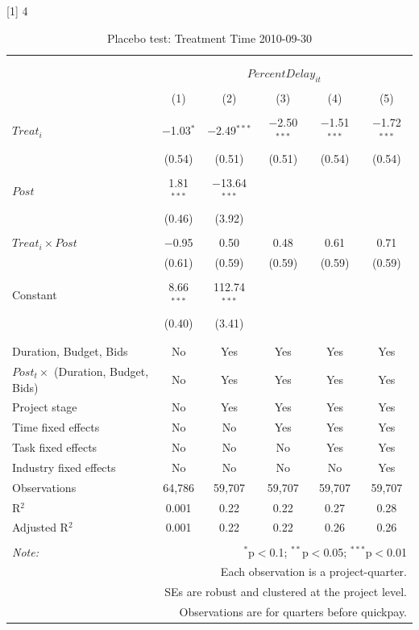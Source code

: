 \documentclass[
]{article}
\begin{document}
{[}1{]} 4

\begin{table}[H] \centering 
  \caption{Placebo test: Treatment Time 2010-09-30} 
  \label{} 
\small 
\begin{tabular}{@{\extracolsep{-2pt}}lccccc} 
\\[-1.8ex]\hline 
\hline \\[-1.8ex] 
\\[-1.8ex] & \multicolumn{5}{c}{$PercentDelay_{it}$} \\ 
\\[-1.8ex] & (1) & (2) & (3) & (4) & (5)\\ 
\hline \\[-1.8ex] 
 $Treat_i$ & $-$1.03$^{*}$ & $-$2.49$^{***}$ & $-$2.50$^{***}$ & $-$1.51$^{***}$ & $-$1.72$^{***}$ \\ 
  & (0.54) & (0.51) & (0.51) & (0.54) & (0.54) \\ 
  & & & & & \\ 
 $Post$ & 1.81$^{***}$ & $-$13.64$^{***}$ &  &  &  \\ 
  & (0.46) & (3.92) &  &  &  \\ 
  & & & & & \\ 
 $Treat_i \times Post$ & $-$0.95 & 0.50 & 0.48 & 0.61 & 0.71 \\ 
  & (0.61) & (0.59) & (0.59) & (0.59) & (0.59) \\ 
  & & & & & \\ 
 Constant & 8.66$^{***}$ & 112.74$^{***}$ &  &  &  \\ 
  & (0.40) & (3.41) &  &  &  \\ 
  & & & & & \\ 
\hline \\[-1.8ex] 
Duration, Budget, Bids & No & Yes & Yes & Yes & Yes \\ 
$Post_t \times$  (Duration, Budget, Bids) & No & Yes & Yes & Yes & Yes \\ 
Project stage & No & Yes & Yes & Yes & Yes \\ 
Time fixed effects & No & No & Yes & Yes & Yes \\ 
Task fixed effects & No & No & No & Yes & Yes \\ 
Industry fixed effects & No & No & No & No & Yes \\ 
Observations & 64,786 & 59,707 & 59,707 & 59,707 & 59,707 \\ 
R$^{2}$ & 0.001 & 0.22 & 0.22 & 0.27 & 0.28 \\ 
Adjusted R$^{2}$ & 0.001 & 0.22 & 0.22 & 0.26 & 0.26 \\ 
\hline 
\hline \\[-1.8ex] 
\textit{Note:}  & \multicolumn{5}{r}{$^{*}$p$<$0.1; $^{**}$p$<$0.05; $^{***}$p$<$0.01} \\ 
 & \multicolumn{5}{r}{Each observation is a project-quarter.} \\ 
 & \multicolumn{5}{r}{SEs are robust and clustered at the project level.} \\ 
 & \multicolumn{5}{r}{Observations are for quarters before quickpay.} \\ 
\end{tabular} 
\end{table}
\end{document}
